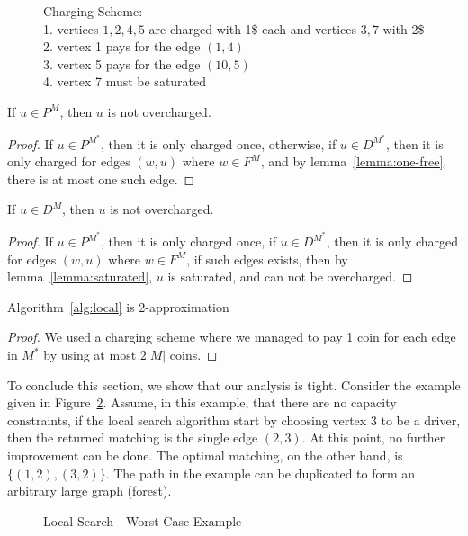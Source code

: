 \begin{figure}
\centering

\caption[]{
\label{fig:charging}
Charging Scheme:															\\
1. vertices $1,2,4,5$ are charged with 1\$ each and vertices $3,7$ with 2\$	\\
2. vertex 1 pays for the edge $(1, 4)$										\\
3. vertex 5 pays for the edge $(10, 5)$										\\
4. vertex 7 must be saturated
}
\end{figure}

\begin{lemma}
\label{lemma:p-not-charged}
If $u \in P^M$, then $u$ is not overcharged.
\end{lemma}

\begin{proof}
If $u \in P^{M^*}$, then it is only charged once, otherwise, 
if $u \in D^{M^*}$, then it is only charged for edges $(w, u)$ where $w \in F^M$,
and by lemma~\ref{lemma:one-free}, there is at most one such edge. 
\end{proof}

\begin{lemma}
\label{lemma:d-not-charged}
If $u \in D^M$, then $u$ is not overcharged.
\end{lemma}

\begin{proof}
If $u \in P^{M^*}$, then it is only charged once, 
if $u \in D^{M^*}$, then it is only charged for edges $(w, u)$ where $w \in F^M$,
if such edges exists, then by lemma~\ref{lemma:saturated}, $u$ is saturated, 
and can not be overcharged.
\end{proof}

\begin{theorem}
Algorithm~\ref{alg:local} is 2-approximation
\end{theorem}

\begin{proof}
We used a charging scheme where we managed to pay 1 coin for each edge in $M^*$
by using at most $2|M|$ coins.
\end{proof}


To conclude this section, we show that our analysis is tight.
Consider the example given in Figure~\ref{fig:localtight}.
Assume, in this example, that there are no capacity constraints,
if the local search algorithm start by choosing vertex $3$ to be a driver, 
then the returned matching is the single edge $(2,3)$.
At this point, no further improvement can be done.
The optimal matching, on the other hand, is $\{(1, 2), (3, 2)\}$. 
The path in the example can be duplicated to form an arbitrary large graph (forest).

\begin{figure} 

\caption{
\label{fig:localtight}
Local Search - Worst Case Example
}
\end{figure}